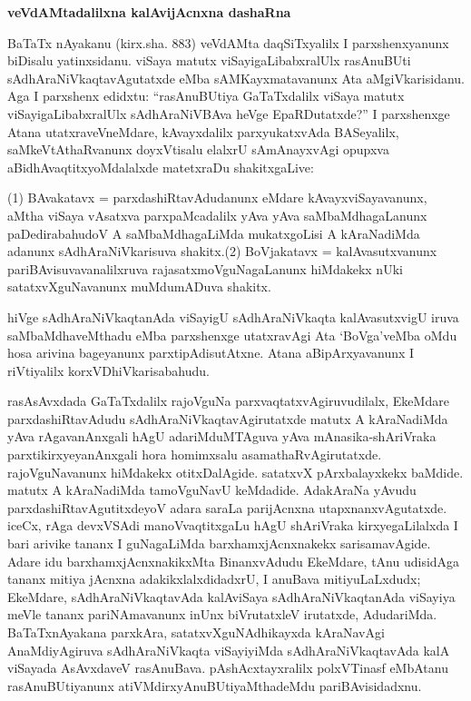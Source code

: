 \smallskip
\begin{center}
{\Large\bf veVdAMtadalilxna kalAvijAcnxna dashaRna}
\end{center}

BaTaTx nAyakanu (kirx.sha. 883) veVdAMta daqSiTxyalilx I parxshenxyanunx biDisalu yatinxsidanu. viSaya matutx viSayigaLibabxralUlx rasAnuBUti \hbox{sAdhAraNiVkaqtavAgutatxde} eMba sAMKayxmatavanunx Ata aMgiVkarisidanu. Aga I parxshenx edidxtu: ``rasAnuBUtiya GaTaTxdalilx viSaya matutx viSayigaLibabxralUlx sAdhAraNiVBAva heVge EpaRDutatxde?'' I parxshenxge Atana utatxraveVneMdare, kAvayxdalilx parxyukatxvAda BASeyalilx, saMkeVtAthaR\-vanunx doyxVtisalu elalxrU sAmAnayxvAgi opupxva aBidhAvaqtitxyoMdalalxde matetxraDu shakitx\-gaLive:

(1) BAvakatavx = parxdashiRtavAdudanunx eMdare kAvayxviSayavanunx, aMtha viSaya vAsatxva parxpaMcadalilx yAva yAva saMbaMdhagaLanunx paDedirabahudoV A saMbaMdhagaLiMda mukatxgoLisi A kAraNadiMda adanunx sAdhAraNiVkarisuva shakitx.\break (2) BoVja\-katavx = kalAvasutxvanunx pariBAvisuvavanalilxruva rajasatxmoVguNagaLanunx hiMdakekx nUki satatxvXguNavanunx muMdumADuva shakitx.

hiVge sAdhAraNiVkaqtanAda viSayigU sAdhAraNiVkaqta kalAvasutxvigU iruva saMbaMdhaveMthadu eMba parxshenxge utatxravAgi Ata `BoVga'veMba oMdu hosa arivina bageyanunx parxtipAdisutAtxne. Atana aBipArxyavanunx I riVtiyalilx korxVDhiVkarisabahudu.

rasAsAvxdada GaTaTxdalilx rajoVguNa parxvaqtatxvAgiruvudilalx, EkeMdare parxdashiRta\-vAdudu sAdhAraNiVkaqtavAgirutatxde matutx A kAraNadiMda yAva rAgavanAnxgali hAgU adariMduMTAguva yAva mAnasika-shAriVraka parxtikirxyeyanAnxgali hora homimxsalu asamathaRvAgirutatxde. rajoVguNavanunx hiMdakekx otitxDalAgide. satatxvX pArxbalayxkekx baMdide. matutx A kAraNadiMda tamoVguNavU keMdadide. AdakAraNa yAvudu parxdashiRtavAgutitxdeyoV adara saraLa parijAcnxna utapxnanxvAgutatxde. iceCx, rAga devxVSAdi manoVvaqtitxgaLu hAgU shAriVraka kirxyegaLilalxda I bari arivike tananx I guNagaLiMda barxhamxjAcnxnakekx sarisamavAgide. Adare idu barxhamxjAcnxnakikxMta Binanx\-vAdudu EkeMdare, tAnu udisidAga tananx mitiya jAcnxna adakikxlalxdidadxrU, I anuBava miti\-yuLaLxdudx; EkeMdare, sAdhAraNiVkaqtavAda kalAviSaya sAdhAraNiVkaqtanAda viSayiya meVle tananx pariNAmavanunx inUnx biVrutatxleV irutatxde, AdudariMda. BaTaTxnAyakana parxkAra, satatxvXguNAdhikayxda kAraNavAgi AnaMdiyAgiruva sAdhAraNiVkaqta viSayi\-yiMda sAdhAraNiVkaqtavAda kalA viSayada AsAvxdaveV rasAnuBava. pAshAcxtayxralilx polxVTinasf eMbAtanu rasAnuBUtiyanunx atiVMdirxyAnuBUtiyaMthadeMdu pariBAvisidadxnu.

